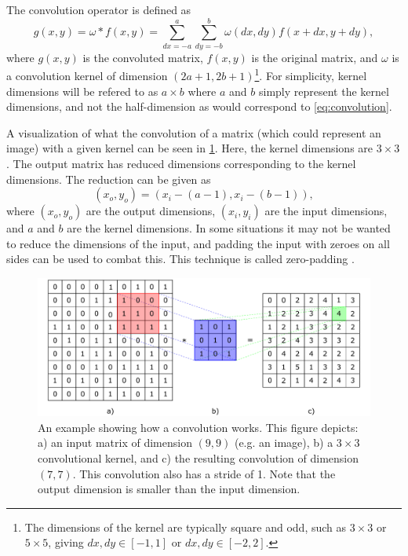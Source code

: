 The convolution operator is defined as 
\begin{equation}
    \label{eq:convolution}
    g(x,y) = \omega \ast f(x,y) = \sum_{dx=-a}^{a}\sum_{dy=-b}^{b} \omega(dx,dy)f(x+dx,y+dy),
\end{equation}
where $g(x,y)$ is the convoluted matrix, $f(x,y)$ is the original matrix, and $\omega$ is a convolution kernel of dimension $(2a+1,2b+1)$\footnote{The dimensions of the kernel are typically square and odd, such as $3\times3$ or $5\times5$, giving $dx,dy\in[-1,1]$ or $dx,dy\in[-2,2]$. }. For simplicity, kernel dimensions will be refered to as $a\times b$ where $a$ and $b$ simply represent the kernel dimensions, and not the half-dimension as would correspond to \cref{eq:convolution}. 

A visualization of what the convolution of a matrix (which could represent an image) with a given kernel can be seen in \cref{fig:convolution}. Here, the kernel dimensions are $3\times3$. The output matrix has reduced dimensions corresponding to the kernel dimensions. The reduction can be given as 
\begin{equation}
    \left( x_o,y_o \right) = \left( x_i - \left(a - 1\right), x_i - \left( b - 1 \right) \right),
\end{equation}
where $(x_o,y_o)$ are the output dimensions, $(x_i,y_i)$ are the input dimensions, and $a$ and $b$ are the kernel dimensions. In some situations it may not be wanted to reduce the dimensions of the input, and padding the input with zeroes on all sides can be used to combat this. This technique is called zero-padding \cite{oshea2015introduction}. 
\begin{figure}[htbp]  
    \centering
    \includegraphics[width=.85\textwidth]{figures/convolution.pdf}
    \caption[Convolution example]{An example showing how a convolution works. This figure depicts: a) an input matrix of dimension $(9,9)$ (e.g. an image), b) a $3\times3$ convolutional kernel, and c) the resulting convolution of dimension $(7,7)$. This convolution also has a stride of 1. Note that the output dimension is smaller than the input dimension. }
    \label{fig:convolution}
\end{figure}

